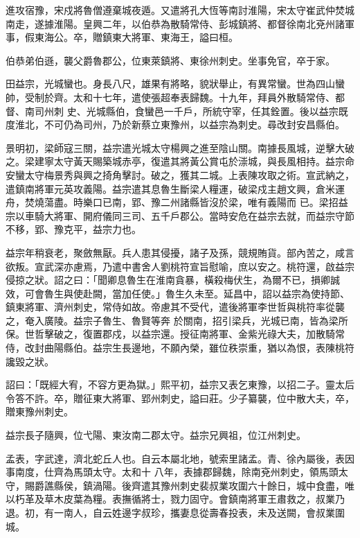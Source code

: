 \begin{pinyinscope}
 進攻宿豫，宋戍將魯僧遵棄城夜遁。又遣將孔大恆等南討淮陽，宋太守崔武仲焚城南走，遂據淮陽。皇興二年，以伯恭為散騎常侍、彭城鎮將、都督徐南北兗州諸軍事，假東海公。卒，贈鎮東大將軍、東海王，謚曰桓。



 伯恭弟伯遜，襲父爵魯郡公，位東萊鎮將、東徐州刺史。坐事免官，卒于家。



 田益宗，光城蠻也。身長八尺，雄果有將略，貌狀舉止，有異常蠻。世為四山蠻帥，受制於齊。太和十七年，遣使張超奉表歸魏。十九年，拜員外散騎常侍、都督、南司州刺
 史、光城縣伯，食蠻邑一千戶，所統守宰，任其銓置。後以益宗既度淮北，不可仍為司州，乃於新蔡立東豫州，以益宗為刺史。尋改封安昌縣伯。



 景明初，梁師寇三關，益宗遣光城太守楊興之進至陰山關。南據長風城，逆擊大破之。梁建寧太守黃天賜築城赤亭，復遣其將黃公賞屯於漴城，與長風相持。益宗命安蠻太守梅景秀與興之掎角擊討。破之，獲其二城。上表陳攻取之術。宣武納之，遣鎮南將軍元英攻義陽。益宗遣其息魯生斷梁人糧運，破梁戍主趙文興，倉米運舟，焚燒蕩盡。時樂口已南，郢、豫二州諸縣皆沒於梁，唯有義陽而
 已。梁招益宗以車騎大將軍、開府儀同三司、五千戶郡公。當時安危在益宗去就，而益宗守節不移，郢、豫克平，益宗力也。



 益宗年稍衰老，聚斂無厭。兵人患其侵擾，諸子及孫，競規賄貨。部內苦之，咸言欲叛。宣武深亦慮焉，乃遣中書舍人劉桃符宣旨慰喻，庶以安之。桃符還，啟益宗侵掠之狀。詔之曰：「聞卿息魯生在淮南貪暴，橫殺梅伏生，為爾不已，損卿誠效，可會魯生與使赴闕，當加任使。」魯生久未至。延昌中，詔以益宗為使持節、鎮東將軍、濟州刺史，常侍如故。帝慮其不受代，遣後將軍李世哲與桃符率從襲之，奄入廣陵。益宗子魯生、魯賢等奔
 於關南，招引梁兵，光城已南，皆為梁所保。世哲擊破之，復置郡戍，以益宗還。授征南將軍、金紫光祿大夫，加散騎常侍，改封曲陽縣伯。益宗生長邊地，不願內榮，雖位秩崇重，猶以為恨，表陳桃符讒毀之狀。



 詔曰：「既經大宥，不容方更為獄。」熙平初，益宗又表乞東豫，以招二子。靈太后令答不許。卒，贈征東大將軍、郢州刺史，謚曰莊。少子纂襲，位中散大夫，卒，贈東豫州刺史。



 益宗長子隨興，位弋陽、東汝南二郡太守。益宗兄興祖，位江州刺史。



 孟表，字武達，濟北蛇丘人也。自云本屬北地，號索里諸孟。青、徐內屬後，表因事南度，仕齊為馬頭太守。太和十
 八年，表據郡歸魏，除南兗州刺史，領馬頭太守，賜爵譙縣侯，鎮渦陽。後齊遣其豫州刺史裴叔業攻圍六十餘日，城中食盡，唯以朽革及草木皮葉為糧。表撫循將士，戮力固守。會鎮南將軍王肅救之，叔業乃退。初，有一南人，自云姓邊字叔珍，攜妻息從壽春投表，未及送闕，會叔業圍城。




\end{pinyinscope}

